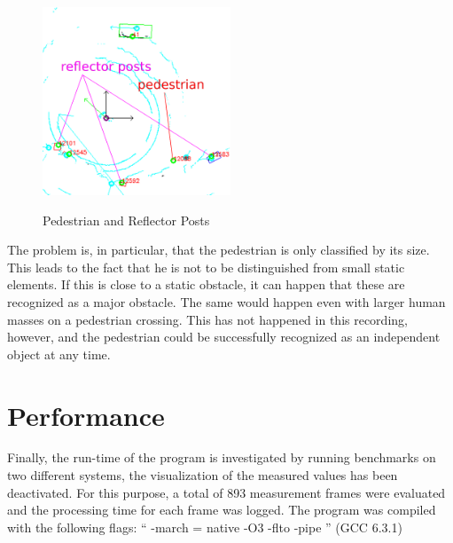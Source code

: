 \documentclass[11pt,oneside,openright]{mpreport}
\begin{document}
\begin{figure}[!htb]
  \caption{Pedestrian and Reflector Posts} 
  \centering
  \includegraphics[width=0.5\textwidth]{bilder/reflector_posts.png}
 \label{refPosts}
\end{figure}
% 
The problem is, in particular, that the pedestrian is only classified by its size. 
This leads to the fact that he is not to be distinguished from small static elements.
If this is close to a static obstacle, it can happen that these are recognized as a major obstacle.
The same would happen even with larger human masses on a pedestrian crossing.
This has not happened in this recording, however, and the pedestrian could be successfully recognized as an independent object at any time.


\section{Performance}

Finally, the run-time of the program is investigated by running benchmarks on two different systems,
the visualization of the measured values has been deactivated. For this purpose, a total of 893 measurement
frames were evaluated and the processing time for each frame was logged. 
The program was compiled with the following flags: `` -march = native -O3 -flto -pipe '' (GCC 6.3.1)
\end{document}
